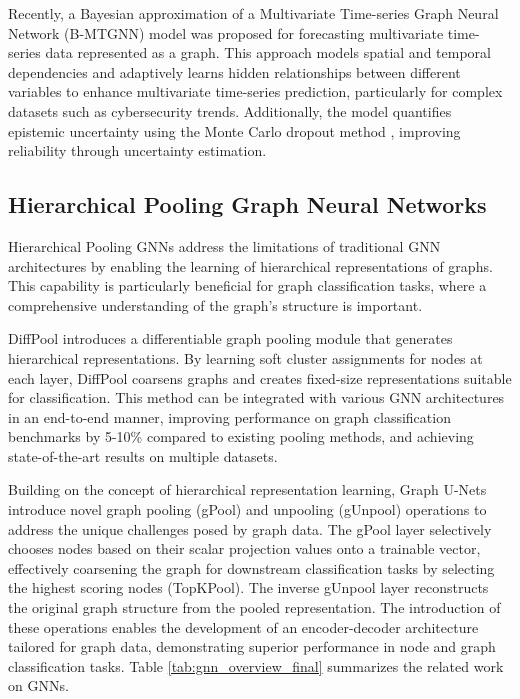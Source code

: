\documentclass[journal]{IEEEtran}
\begin{document}
Recently, a Bayesian approximation \cite{almahmoud2025forecasting} of a Multivariate Time-series Graph Neural Network (B-MTGNN) model \cite{wu2020connecting} was proposed for forecasting multivariate time-series data represented as a graph. This approach models spatial and temporal dependencies and adaptively learns hidden relationships between different variables to enhance multivariate time-series prediction, particularly for complex datasets such as cybersecurity trends. Additionally, the model quantifies epistemic uncertainty using the Monte Carlo dropout method \cite{almahmoud2023holistic}, improving reliability through uncertainty estimation.



\subsection{Hierarchical Pooling Graph Neural Networks}

Hierarchical Pooling GNNs address the limitations of traditional GNN architectures by enabling the learning of hierarchical representations of graphs. This capability is particularly beneficial for graph classification tasks, where a comprehensive understanding of the graph's structure is important.

DiffPool \cite{ying2018hierarchical} introduces a differentiable graph pooling module that generates hierarchical representations. By learning soft cluster assignments for nodes at each layer, DiffPool coarsens graphs and creates fixed-size representations suitable for classification. This method can be integrated with various GNN architectures in an end-to-end manner, improving performance on graph classification benchmarks by 5-10\% compared to existing pooling methods, and achieving state-of-the-art results on multiple datasets.


Building on the concept of hierarchical representation learning, Graph U-Nets \cite{gao2019graph} introduce novel graph pooling (gPool) and unpooling (gUnpool) operations to address the unique challenges posed by graph data. The gPool layer selectively chooses nodes based on their scalar projection values onto a trainable vector, effectively coarsening the graph for downstream classification tasks by selecting the highest scoring nodes (TopKPool). The inverse gUnpool layer reconstructs the original graph structure from the pooled representation. The introduction of these operations enables the development of an encoder-decoder architecture tailored for graph data, demonstrating superior performance in node and graph classification tasks. Table \ref{tab:gnn_overview_final} summarizes the related work on GNNs. 
\end{document}
